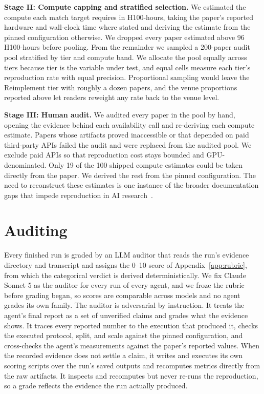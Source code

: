 \documentclass{article} %
\begin{document}
\textbf{Stage II: Compute capping and stratified selection.} We estimated the
compute each match target requires in H100-hours, taking the paper's reported
hardware and wall-clock time where stated and deriving the estimate from the
pinned configuration otherwise. We dropped every paper estimated above 96
H100-hours before pooling. From the remainder we sampled a 200-paper audit
pool stratified by tier and compute band. We allocate the pool equally across
tiers because tier is the variable under test, and equal cells measure each
tier's reproduction rate with equal precision. Proportional sampling would leave the Reimplement tier with roughly a
dozen papers, and the venue proportions reported above let readers reweight
any rate back to the venue level.

\textbf{Stage III: Human audit.} We audited every paper in the pool by hand,
opening the evidence behind each availability call and re-deriving each compute
estimate. Papers whose artifacts proved inaccessible or that depended on paid
third-party APIs failed the audit and were replaced from the audited pool. We
exclude paid APIs so that reproduction cost stays bounded and
GPU-denominated. Only 19 of
the 100 shipped compute estimates could be taken directly from the paper. We
derived the rest from the pinned configuration. The need to reconstruct these
estimates is one instance of the broader documentation gaps that impede
reproduction in AI research~\citep{gundersen2018state}.
\section{Auditing}
\label{sec:auditing}

Every finished run is graded by an LLM auditor that reads the
run's evidence directory and transcript and assigns the 0--10 score of
Appendix~\ref{app:rubric}, from which the categorical verdict is derived
deterministically. We fix Claude Sonnet 5 as the auditor for every run of
every agent, and we froze the rubric before grading began, so scores are
comparable across models and no agent grades its own family. The auditor is
adversarial by instruction. It treats the agent's final report as a set of
unverified claims and grades what the evidence shows. It traces every
reported number to the execution that produced it, checks the executed
protocol, split, and scale against the pinned configuration, and
cross-checks the agent's measurements against the paper's reported values.
When the recorded evidence does not settle a claim, it writes and executes
its own scoring scripts over the run's saved outputs and recomputes
metrics directly from the raw artifacts. It inspects
and recomputes but never re-runs the reproduction, so a grade reflects the
evidence the run actually produced.
\end{document}
